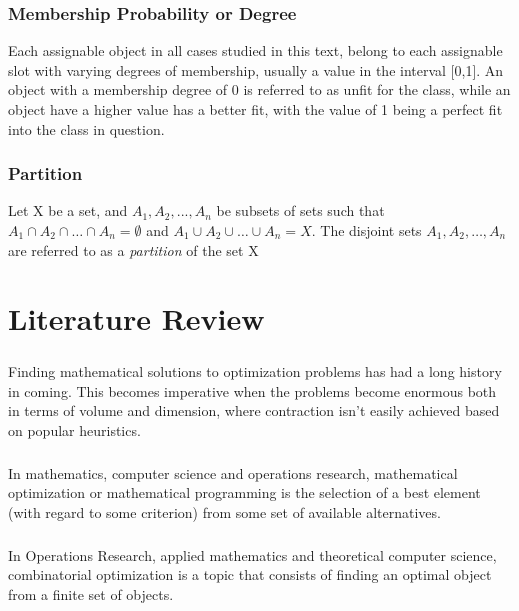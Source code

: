 \documentclass[a4paper,openany]{book}
\begin{document}
            \subsection{Membership Probability or Degree}
               Each assignable object in all cases studied in this text, belong to each assignable slot with varying degrees of membership, usually a value in the interval [0,1]. An object with a membership degree of 0 is referred to as unfit for the class, while an object have a higher value has a better fit, with the value of 1 being a perfect fit into the class in question.
            \subsection{Partition}
               Let X be a set, and $A_1, A_2,...,A_n$ be subsets of sets such that $A_1 \cap A_2 \cap \dots \cap A_n = \emptyset$ and $A_1 \cup A_2 \cup \dots \cup A_n = X$. The disjoint sets $A_1, A_2, \dots, A_n$ are referred to as a \textit{partition} of the set X
	\chapter{Literature Review}
		\paragraph{}
			Finding mathematical solutions to optimization problems has had a long history in coming. This becomes imperative when the problems become enormous both in terms of volume and dimension, where contraction isn't easily achieved based on popular heuristics.
		\paragraph{}
			In mathematics, computer science and operations research, mathematical optimization or mathematical programming is the selection of a best element (with regard to some criterion) from some set of available alternatives. \cite{arjang}
		\paragraph{}
			In Operations Research, applied mathematics and theoretical computer science, combinatorial optimization is a topic that consists of finding an optimal object from a finite set of objects. \cite{schrijver2}
\end{document}
